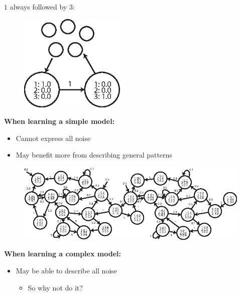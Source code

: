 \begin{frame}
\center
$1$ always followed by $3$:
\begin{figure}
\includegraphics[width=0.45\textwidth]{images/simplemodel.eps}
\end{figure}
\textbf{When learning a simple model:}
\begin{itemize}
\item Cannot express all noise
\item May benefit more from describing general patterns
\end{itemize}
\end{frame}

\begin{frame}
\center
\begin{figure}
\includegraphics[width=1\textwidth]{images/complexmodel.eps}
\end{figure}
\vspace{40pt}
\textbf{When learning a complex model:}\\
\begin{itemize}
\item May be able to describe all noise
  \begin{itemize}
  \item So why not do it?
  \end{itemize}
\end{itemize}
\end{frame}

